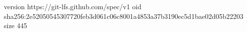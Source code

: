 version https://git-lfs.github.com/spec/v1
oid sha256:2e52050545307720feb3d061c06c8001a4853a37b3190ec5d1bae02d05b22203
size 445
